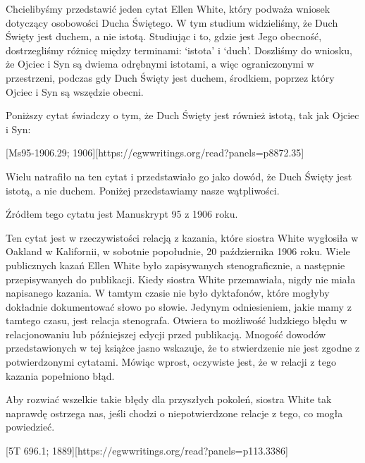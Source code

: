 \label{appendix:unauthenticated-reports}
Chcielibyśmy przedstawić jeden cytat Ellen White, który podważa wniosek dotyczący osobowości Ducha Świętego. W tym studium widzieliśmy, że Duch Święty jest duchem, a nie istotą. Studiując  i to, gdzie jest Jego obecność, dostrzegliśmy różnicę między terminami: ‘istota’ i ‘duch’. Doszliśmy do wniosku, że Ojciec i Syn są dwiema odrębnymi istotami, a więc ograniczonymi w przestrzeni, podczas gdy Duch Święty jest duchem, środkiem, poprzez który Ojciec i Syn są wszędzie obecni.

Poniższy cytat świadczy o tym, że Duch Święty jest również istotą, tak jak Ojciec i Syn:

[Ms95-1906.29; 1906][https://egwwritings.org/read?panels=p8872.35]

Wielu natrafiło na ten cytat i przedstawiało go jako dowód, że Duch Święty jest istotą, a nie duchem. Poniżej przedstawiamy nasze wątpliwości.

Źródłem tego cytatu jest Manuskrypt 95 z 1906 roku.

Ten cytat jest w rzeczywistości relacją z kazania, które siostra White wygłosiła w Oakland w Kalifornii, w sobotnie popołudnie, 20 października 1906 roku. Wiele publicznych kazań Ellen White było zapisywanych stenograficznie, a następnie przepisywanych do publikacji. Kiedy siostra White przemawiała, nigdy nie miała napisanego kazania. W tamtym czasie nie było dyktafonów, które mogłyby dokładnie dokumentować słowo po słowie. Jedynym odniesieniem, jakie mamy z tamtego czasu, jest relacja stenografa. Otwiera to możliwość ludzkiego błędu w relacjonowaniu lub późniejszej edycji przed publikacją. Mnogość dowodów przedstawionych w tej książce jasno wskazuje, że to stwierdzenie nie jest zgodne z potwierdzonymi cytatami. Mówiąc wprost, oczywiste jest, że w relacji z tego kazania popełniono błąd.

Aby rozwiać wszelkie takie błędy dla przyszłych pokoleń, siostra White tak naprawdę ostrzega nas, jeśli chodzi o niepotwierdzone relacje z tego, co mogła powiedzieć.

[5T 696.1; 1889][https://egwwritings.org/read?panels=p113.3386]

